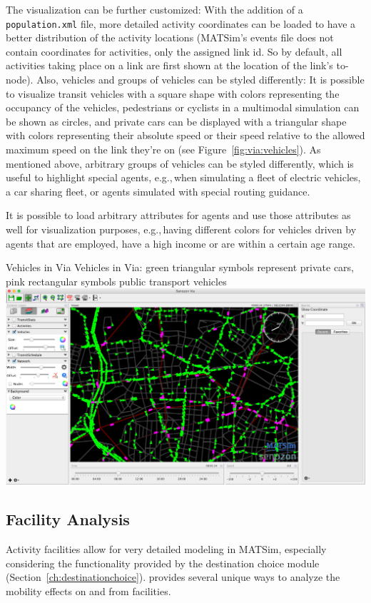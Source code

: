 The visualization can be further customized: With the addition of a \lstinline|population.xml| file, more detailed activity coordinates can be loaded to have a
better distribution of the activity locations (MATSim's events file does not
contain coordinates for activities, only the assigned link id. So by default,
all activities taking place on a link are first shown at the location of
the link's to-node). Also, vehicles and groups of vehicles can be styled
differently: It is possible to visualize transit vehicles with a square shape
with colors representing the occupancy of the vehicles, pedestrians or
cyclists in a multimodal simulation can be shown as circles, and private cars
can be displayed with a triangular shape with colors representing their
absolute speed or their speed relative to the allowed maximum speed on the link
they're on (see Figure~\ref{fig:via:vehicles}). As mentioned above, arbitrary
groups of vehicles can be styled differently, which is useful to highlight
special agents, e.g.,\,when simulating a fleet of electric vehicles, a car sharing
fleet, or agents simulated with special routing guidance.

It is possible to load arbitrary attributes for agents and use those attributes
as well for visualization purposes, e.g.,\,having different colors for vehicles
driven by agents that are employed, have a high income or are within a certain
age range.

\createfigure%
{Vehicles in Via}%
{Vehicles in Via: green triangular symbols represent private cars, pink rectangular symbols public transport vehicles }%
{\label{fig:via:vehicles}}%
{\includegraphics[width=1.\textwidth,angle=0]{./extending/figures/via/vehicles}}%
{}

\subsection{Facility Analysis}
Activity facilities allow for very detailed modeling in MATSim, especially
considering the functionality provided by the destination choice module
(Section~\ref{ch:destinationchoice}). \Via{} provides several unique ways to
analyze the mobility effects on and from facilities.

